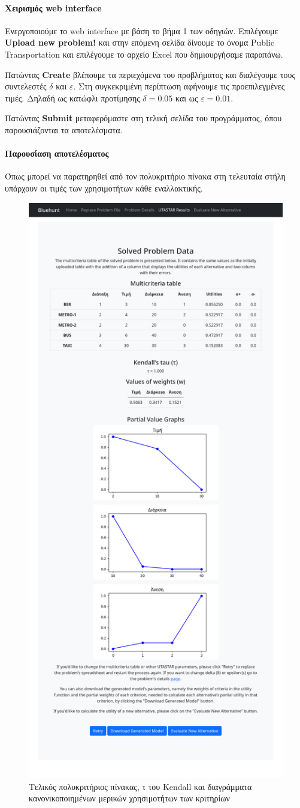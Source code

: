 \documentclass[11pt,a4paper,titlepage]{article}
\numberwithin{equation}{section}
\begin{document}
\paragraph{Χειρισμός web interface}
Ενεργοποιούμε το web interface με βάση το βήμα 1 των οδηγιών. Επιλέγουμε \textbf{Upload new problem!} και στην επόμενη σελίδα δίνουμε το όνομα Public Transportation και επιλέγουμε το αρχείο Excel που δημιουργήσαμε παραπάνω.

Πατώντας \textbf{Create} βλέπουμε τα περιεχόμενα του προβλήματος και διαλέγουμε τους συντελεστές $δ$ και $ε$. Στη συγκεκριμένη περίπτωση αφήνουμε τις προεπιλεγμένες τιμές. Δηλαδή ως κατώφλι προτίμησης $δ = 0.05$ και ως $ε = 0.01$.

Πατώντας \textbf{Submit} μεταφερόμαστε στη τελική σελίδα του προγράμματος, όπου παρουσιάζονται τα αποτελέσματα.

\paragraph{Παρουσίαση αποτελέσματος}
Όπως μπορεί να παρατηρηθεί από τον πολυκριτήριο πίνακα στη τελευταία στήλη υπάρχουν οι τιμές των χρησιμοτήτων κάθε εναλλακτικής.

\begin{figure}[H]
	\centering
	\includegraphics[width=0.65\linewidth]{media/results.png}
	\caption{Τελικός πολυκριτήριος πίνακας, τ του Kendall και διαγράμματα κανονικοποιημένων μερικών χρησιμοτήτων των κριτηρίων}
	\label{fig:results_1_1}
\end{figure}
\end{document}
